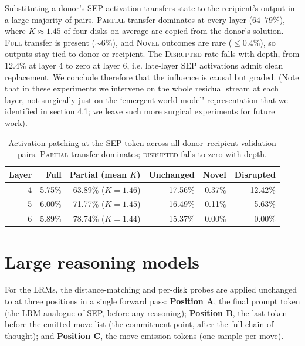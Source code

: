 \documentclass{article} %
\begin{document}
Substituting a donor's SEP activation transfers state to the recipient's output in a large majority of pairs. \textsc{Partial} transfer dominates at every layer ($64$--$79\%$), where $K\approx1.45$ of four disks on average are copied from the donor's solution. \textsc{Full} transfer is present ($\sim6\%$), and \textsc{Novel} outcomes are rare ($\leq0.4\%$), so outputs stay tied to donor or recipient. The \textsc{Disrupted} rate falls with depth, from $12.4\%$ at layer 4 to zero at layer 6, i.e. late-layer SEP activations admit clean replacement. We conclude therefore that the influence is causal but graded.
(Note that in these experiments we intervene on the whole residual stream at each layer, not surgically just on the `emergent world model' representation that we identified in section 4.1; we leave such more surgical experiments for future work).

\begin{table}[t]
  \centering
  \caption{Activation patching at the SEP token across all donor--recipient validation pairs. \textsc{Partial} transfer dominates; \textsc{disrupted} falls to zero with depth.}
  \label{tab:patching}
  \begin{tabular}{rrrrrr}
    \toprule
    \textbf{Layer} & \textbf{Full} & \textbf{Partial (mean $K$)} & \textbf{Unchanged} & \textbf{Novel} & \textbf{Disrupted} \\
    \midrule
    4 & 5.75\% & 63.89\% ($K{=}1.46$) & 17.56\% & 0.37\% & 12.42\% \\
    5 & 6.00\% & 71.77\% ($K{=}1.45$) & 16.49\% & 0.11\% &  5.63\% \\
    6 & 5.89\% & 78.74\% ($K{=}1.44$) & 15.37\% & 0.00\% &  0.00\% \\
    \bottomrule
  \end{tabular}
\end{table}


\section{Large reasoning models}%
\label{sec:lrm}

For the LRMs, the distance-matching and per-disk probes are applied unchanged to at three positions in a single forward pass: \textbf{Position A}, the final prompt token (the LRM analogue of SEP, before any reasoning); \textbf{Position B}, the last token before the emitted move list (the commitment point, after the full chain-of-thought); and \textbf{Position C}, the move-emission tokens (one sample per move).
\end{document}
